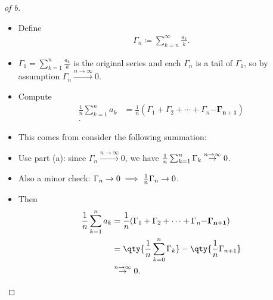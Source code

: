 \begin{solution}
\begin{proof}[of b]
\begin{itemize}
\item
  Define
  \begin{align*}
  \Gamma_n \coloneqq\sum_{k=n}^\infty \frac{a_k}{k}
  .\end{align*}
\item
  \(\Gamma_1 = \sum_{k=1}^n \frac{ a_k } k\) is the original series and
  each \(\Gamma_n\) is a tail of \(\Gamma_1\), so by assumption
  \(\Gamma_n \overset{n\to\infty}\to 0\).
\item
  Compute
  \begin{align*}
  \frac 1 n \sum_{k=1}^n a_k 
  &= \frac 1 n (\Gamma_1 + \Gamma_2 + \cdots + \Gamma_{n} \mathbf{- \Gamma_{n+1}}) \\
  .\end{align*}
\item
  This comes from consider the following summation:

  \begin{center}
  \end{center}
\item
  Use part (a): since \(\Gamma_n \overset{n\to\infty}\to 0\), we have
  \({1\over n} \sum_{k=1}^n \Gamma_k \overset{n\to\infty}\to 0\).
\item
  Also a minor check:
  \(\Gamma_n \to 0 \implies {1\over n}\Gamma_n \to 0\).
\item
  Then
  \begin{align*}
  \frac 1 n \sum_{k=1}^n a_k 
  &= \frac 1 n (\Gamma_1 + \Gamma_2 + \cdots + \Gamma_{n} \mathbf{- \Gamma_{n+1}}) \\
  &= \qty{ {1\over n } \sum_{k=0}^n \Gamma_k } - \qty{{1\over n}\Gamma_{n+1} } \\
  &\overset{n\to\infty}\to 0
  .\end{align*}
\end{itemize}


\end{proof}
\end{solution}
